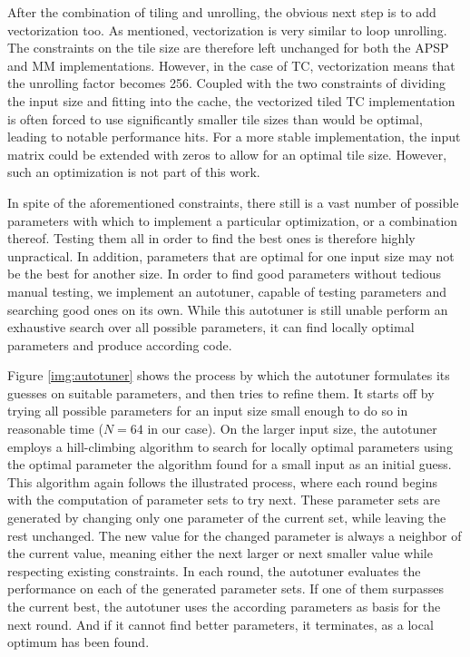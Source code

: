 After the combination of tiling and unrolling, the obvious next step is to add vectorization too. As mentioned, vectorization is very similar to loop unrolling. The constraints on the tile size are therefore left unchanged for both the APSP and MM implementations.
However, in the case of TC, vectorization means that the unrolling factor becomes 256.
Coupled with the two constraints of dividing the input size and fitting into the cache, the vectorized tiled TC implementation is often forced to use significantly smaller tile sizes than would be optimal, leading to notable performance hits.
For a more stable implementation, the input matrix could be extended with zeros to allow for an optimal tile size. However, such an optimization is not part of this work.

In spite of the aforementioned constraints, there still is a vast number of possible parameters with which to implement a particular optimization, or a combination thereof.
Testing them all in order to find the best ones is therefore highly unpractical.
In addition, parameters that are optimal for one input size may not be the best for another size.
In order to find good parameters without tedious manual testing, we implement an autotuner, capable of testing parameters and searching good ones on its own.
While this autotuner is still unable perform an exhaustive search over all possible parameters, it can find locally optimal parameters and produce according code.

Figure \ref{img:autotuner} shows the process by which the autotuner formulates its guesses on suitable parameters, and then tries to refine them. It starts off by trying all possible parameters for an input size small enough to do so in reasonable time ($N=64$ in our case).
On the larger input size, the autotuner employs a hill-climbing algorithm to search for locally optimal parameters using the optimal parameter the algorithm found for a small input as an initial guess.
This algorithm again follows the illustrated process, where each round begins with the computation of parameter sets to try next. These parameter sets are generated by changing only one parameter of the current set, while leaving the rest unchanged. The new value for the changed parameter is always a neighbor of the current value, meaning either the next larger or next smaller value while respecting existing constraints.
In each round, the autotuner evaluates the performance on each of the generated parameter sets. If one of them surpasses the current best, the autotuner uses the according parameters as basis for the next round. And if it cannot find better parameters, it terminates, as a local optimum has been found.

